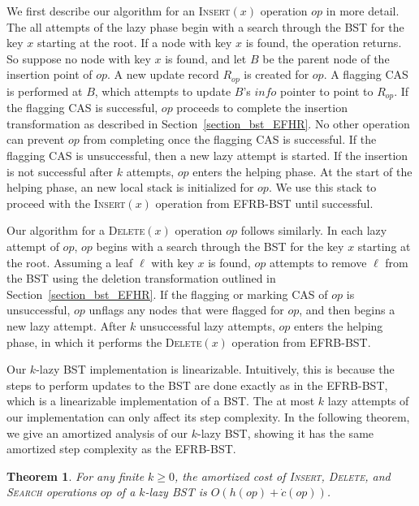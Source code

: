 \documentclass[letterpaper,twocolumn]{article}
\newtheorem{theorem}{Theorem}[]
\newcommand{\info}{\mathit{info}}
\begin{document}
We first describe our algorithm for an \textsc{Insert}$(x)$ operation $op$ in more detail. The all attempts of the lazy phase begin with a search through the BST for the key $x$ starting at the root. If a node with key $x$ is found, the operation returns. So suppose no node with key $x$ is found, and let $B$ be the parent node of the insertion point of $op$. A new update record $R_{op}$ is created for $op$. A flagging CAS is performed at $B$, which attempts to update $B$'s $\info$ pointer to point to $R_{op}$. If the flagging CAS is successful, $op$ proceeds to complete the insertion transformation as described in Section~\ref{section_bst_EFHR}. No other operation can prevent $op$ from completing once the flagging CAS is successful. If the flagging CAS is unsuccessful, then a new lazy attempt is started. If the insertion is not successful after $k$ attempts, $op$ enters the helping phase. At the start of the helping phase, an new local stack is initialized for $op$. We use this stack to proceed with the \textsc{Insert}$(x)$ operation from EFRB-BST until successful.

Our algorithm for a \textsc{Delete}$(x)$ operation $op$ follows similarly. In each lazy attempt of $op$, $op$ begins with a search through the BST for the key $x$ starting at the root. Assuming a leaf $\ell$ with key $x$ is found, $op$ attempts to remove $\ell$ from the BST using the deletion transformation outlined in Section~\ref{section_bst_EFHR}. If the flagging or marking CAS of $op$ is unsuccessful, $op$ unflags any nodes that were flagged for $op$, and then begins a new lazy attempt. After $k$ unsuccessful lazy attempts, $op$ enters the helping phase, in which it performs the \textsc{Delete}$(x)$ operation from EFRB-BST.

Our $k$-lazy BST implementation is linearizable. Intuitively, this is because the steps to perform updates to the BST are done exactly as in the EFRB-BST, which is a linearizable implementation of a BST. The at most $k$ lazy attempts of our implementation can only affect its step complexity. In the following theorem, we give an amortized analysis of our $k$-lazy BST, showing it has the same amortized step complexity as the EFRB-BST.

\begin{theorem}
For any finite $k \geq 0$, the amortized cost of \textsc{Insert}, \textsc{Delete}, and \textsc{Search} operations $op$ of a $k$-lazy BST is $O(h(op) + \dot{c}(op))$.
\end{theorem}
\end{document}
